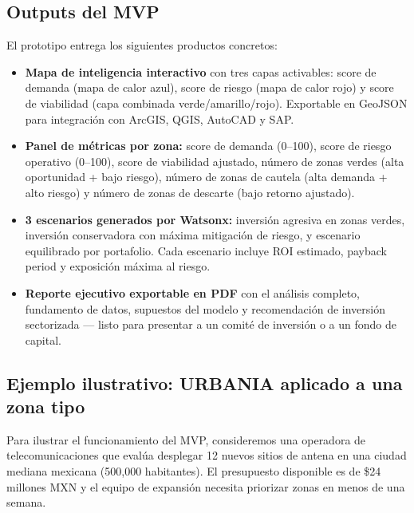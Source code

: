 \documentclass[12pt,a4paper]{article}
\begin{document}
\subsection{Outputs del MVP}

El prototipo entrega los siguientes productos concretos:

\begin{itemize}[leftmargin=1.5cm, itemsep=4pt]
  \item \textbf{Mapa de inteligencia interactivo} con tres capas activables: score de demanda (mapa de calor azul), score de riesgo (mapa de calor rojo) y score de viabilidad (capa combinada verde/amarillo/rojo). Exportable en GeoJSON para integración con ArcGIS, QGIS, AutoCAD y SAP.
  \item \textbf{Panel de métricas por zona:} score de demanda (0–100), score de riesgo operativo (0–100), score de viabilidad ajustado, número de zonas verdes (alta oportunidad + bajo riesgo), número de zonas de cautela (alta demanda + alto riesgo) y número de zonas de descarte (bajo retorno ajustado).
  \item \textbf{3 escenarios generados por Watsonx:} inversión agresiva en zonas verdes, inversión conservadora con máxima mitigación de riesgo, y escenario equilibrado por portafolio. Cada escenario incluye ROI estimado, payback period y exposición máxima al riesgo.
  \item \textbf{Reporte ejecutivo exportable en PDF} con el análisis completo, fundamento de datos, supuestos del modelo y recomendación de inversión sectorizada — listo para presentar a un comité de inversión o a un fondo de capital.
\end{itemize}

\subsection{Ejemplo ilustrativo: URBANIA aplicado a una zona tipo}

Para ilustrar el funcionamiento del MVP, consideremos una operadora de telecomunicaciones que evalúa desplegar 12 nuevos sitios de antena en una ciudad mediana mexicana (500{,}000 habitantes). El presupuesto disponible es de \$24 millones MXN y el equipo de expansión necesita priorizar zonas en menos de una semana.
\end{document}
